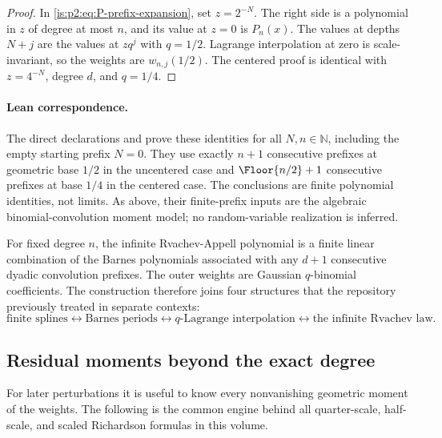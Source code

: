 \begin{proof}
In \eqref{is:p2:eq:P-prefix-expansion}, set $z=2^{-N}$.  The right side is a polynomial in $z$ of degree
at most $n$, and its value at $z=0$ is $P_n(x)$.  The values at depths $N+j$ are the values at
$zq^j$ with $q=1/2$.  Lagrange interpolation at zero is scale-invariant, so the weights are
$w_{n,j}(1/2)$.  The centered proof is identical with $z=4^{-N}$, degree $d$, and $q=1/4$.
\end{proof}

\paragraph{Lean correspondence.}
The direct declarations
 and
 prove these identities
for all \(N,n\in\mathbb N\), including the empty starting prefix \(N=0\).
They use exactly \(n+1\) consecutive prefixes at geometric base \(1/2\) in
the uncentered case and \(\Floor{n/2}+1\) consecutive prefixes at base \(1/4\)
in the centered case.  The conclusions are finite polynomial identities, not
limits.  As above, their finite-prefix inputs are the algebraic
binomial-convolution moment model; no random-variable realization is inferred.

\begin{resultbox}
For fixed degree $n$, the infinite Rvachev-Appell polynomial is a finite linear combination of the
Barnes polynomials associated with any $d+1$ consecutive dyadic convolution prefixes.  The outer
weights are Gaussian $q$-binomial coefficients.  The construction therefore joins four structures
that the repository previously treated in separate contexts:
{\small
\[
 \text{finite splines}
 \longleftrightarrow
 \text{Barnes periods}
 \longleftrightarrow
 \text{$q$-Lagrange interpolation}
 \longleftrightarrow
 \text{the infinite Rvachev law}.
\]
}
\end{resultbox}

\subsection{Residual moments beyond the exact degree}

For later perturbations it is useful to know every nonvanishing geometric
moment of the weights.  The following is the common engine behind all
quarter-scale, half-scale, and scaled Richardson formulas in this volume.

